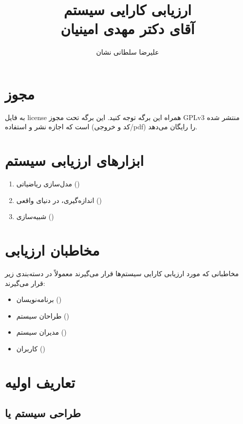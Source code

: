 \documentclass[a4paper]{article}
\title{ارزیابی کارایی سیستم \\ آقای دکتر مهدی امینیان}
\author{علیرضا سلطانی نشان}
\begin{document}
\maketitle
\tableofcontents

\section*{مجوز}

به فایل license همراه این برگه توجه کنید. این برگه تحت مجوز GPLv3 منتشر شده است
که اجازه نشر و استفاده (کد و خروجی/pdf) را رایگان می‌دهد.

\section{ابزار‌های ارزیابی سیستم}

\begin{enumerate}
    \item مدل‌سازی ریاضیاتی ()
    \item اندازه‌گیری، در دنیای واقعی ()
    \item شبیه‌سازی ()
\end{enumerate}

\section{مخاطبان ارزیابی}

مخاطبانی که مورد ارزیابی کارایی سیستم‌ها قرار می‌گیرند معمولاً در دسته‌بندی زیر
قرار می‌گیرند:

\begin{itemize}
    \item برنامه‌نویسان ()
    \item طراحان سیستم ()
    \item مدیران سیستم ()
    \item کاربران ()
\end{itemize}

\section{تعاریف اولیه}

\subsection{طراحی سیستم یا }
\end{document}
